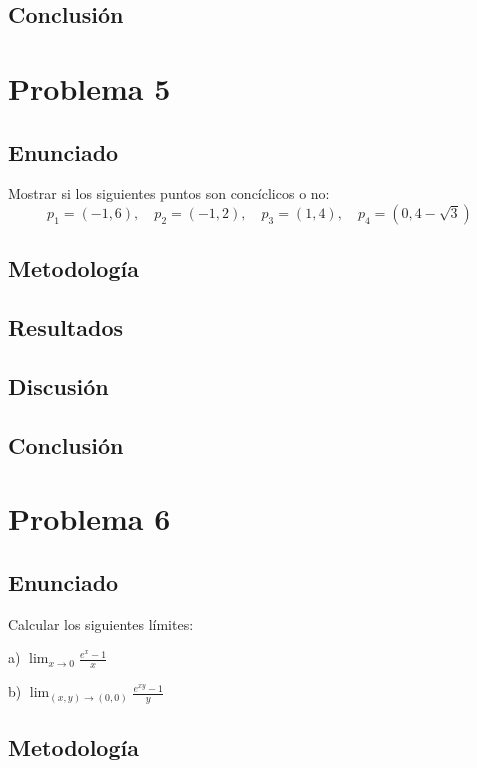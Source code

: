 \documentclass{article}
\begin{document}
\subsection{Conclusión}

\section{Problema 5}

\subsection{Enunciado}
Mostrar si los siguientes puntos son concíclicos o no:
$$p_1 = (-1, 6), \quad p_2 = (-1, 2), \quad p_3 = (1, 4), \quad p_4 = (0, 4 - \sqrt{3})$$

\subsection{Metodología}

\subsection{Resultados}
\setcounter{equation}{0}

\subsection{Discusión}

\subsection{Conclusión}

\section{Problema 6}

\subsection{Enunciado}
Calcular los siguientes límites:

a) $\lim_{x \to 0} \frac{e^x - 1}{x}$

b) $\lim_{(x,y) \to (0,0)} \frac{e^{xy} - 1}{y}$

\subsection{Metodología}
\end{document}
